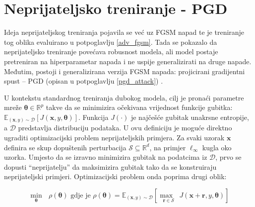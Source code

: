 \documentclass[utf8, diplomski]{fer}
\begin{document}
\section{Neprijateljsko treniranje - PGD}\label{pgd_adv}
Ideja neprijateljskog treniranja pojavila se već uz FGSM napad \citep{Goodfellow2015ExplainingAH} te je treniranje tog oblika evaluirano u potpoglavlju \ref{adv_fgsm}. Tada se pokazalo da neprijateljsko treniranje povećava robusnost modela, ali model postaje pretreniran na hiperparametar napada i ne uspije generalizirati na druge napade. Međutim, postoji i generalizirana verzija FGSM napada: projicirani gradijentni spust -- PGD (opisan u potpoglavlju \ref{pgd_attack}) \citep{Madry2017TowardsDL}. \par 
U kontekstu standardnog treniranja dubokog modela, cilj je pronaći parametre mreže $\boldsymbol{\theta} \in \mathbb{R}^{p}$ takve da se minimizira očekivana vrijednost funkcije gubitka: $\mathbb{E}_{(\boldsymbol{x}, y) \sim \mathcal{D}} [J(\boldsymbol{x}, y, \boldsymbol{\theta})]$. Funkcija $J(\cdot)$ je najčešće gubitak unakrsne entropije, a $\mathcal{D}$ predstavlja distribuciju podataka. U ovu definiciju je moguće direktno ugraditi optimizacijski problem neprijateljskih primjera. Za svaki uzorak $\boldsymbol{x}$ definira se skup dopuštenih perturbacija $\mathcal{S} \subseteq \mathbb{R}^{d}$, na primjer $\ell_{\infty}$ kugla oko uzorka. Umjesto da se izravno minimizira gubitak na podatcima iz $\mathcal{D}$, prvo se dopusti ``neprijatelju'' da maksimizira gubitak tako da se konstruiraju neprijateljski primjeri. Optimizacijski problem onda poprima drugi oblik:

\begin{equation}
\underset{\boldsymbol{\theta}}{\min}\text{ }\rho(\boldsymbol{\theta}) \text{ gdje je } \rho  (\boldsymbol{\theta}) = \mathbb{E}_{(\boldsymbol{x}, y) \sim \mathcal{D}}[\underset{\boldsymbol{r} \in \mathcal{S}}{\max\text{ }} J(\boldsymbol{x} + \boldsymbol{r}, y, \boldsymbol{\theta})]
\end{equation}
\end{document}
